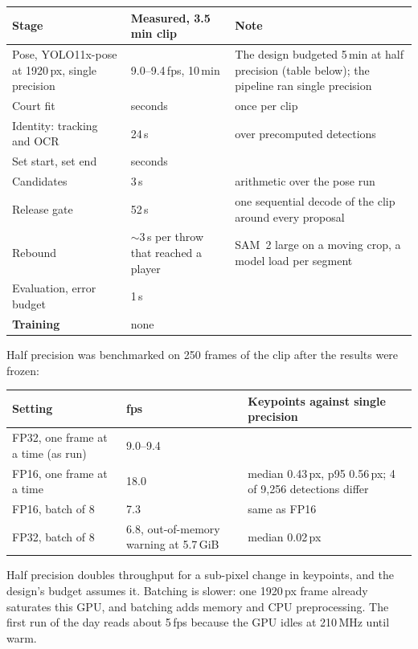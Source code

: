 \documentclass[10pt,a4paper]{article}
\begin{document}
{\footnotesize
\begin{xltabular}{\textwidth}{L{40mm} L{30mm} X}
\toprule
\textbf{Stage} & \textbf{Measured, 3.5\,min clip} & \textbf{Note}\\
\midrule
Pose, YOLO11x-pose at 1920\,px, single precision & 9.0--9.4\,fps, 10\,min & The design budgeted 5\,min at half precision (table below); the pipeline ran single precision\\
Court fit & seconds & once per clip\\
Identity: tracking and OCR & 24\,s & over precomputed detections\\
Set start, set end & seconds & \\
Candidates & 3\,s & arithmetic over the pose run\\
Release gate & 52\,s & one sequential decode of the clip around every proposal\\
Rebound & $\sim$3\,s per throw that reached a player & SAM~2 large on a moving crop, a model load per segment\\
Evaluation, error budget & 1\,s & \\
\midrule
\textbf{Training} & none & \\
\bottomrule
\end{xltabular}}

Half precision was benchmarked on 250 frames of the clip after the results were frozen:

{\footnotesize
\begin{xltabular}{\textwidth}{L{50mm} L{20mm} X}
\toprule
\textbf{Setting} & \textbf{fps} & \textbf{Keypoints against single precision}\\
\midrule
FP32, one frame at a time (as run) & 9.0--9.4 & \\
FP16, one frame at a time & 18.0 & median 0.43\,px, p95 0.56\,px; 4 of 9,256 detections differ\\
FP16, batch of 8 & 7.3 & same as FP16\\
FP32, batch of 8 & 6.8, out-of-memory warning at 5.7\,GiB & median 0.02\,px\\
\bottomrule
\end{xltabular}}

Half precision doubles throughput for a sub-pixel change in keypoints, and the design's
budget assumes it. Batching is slower: one 1920\,px frame already saturates this GPU,
and batching adds memory and CPU preprocessing. The first run of the day reads about
5\,fps because the GPU idles at 210\,MHz until warm.

\end{document}
